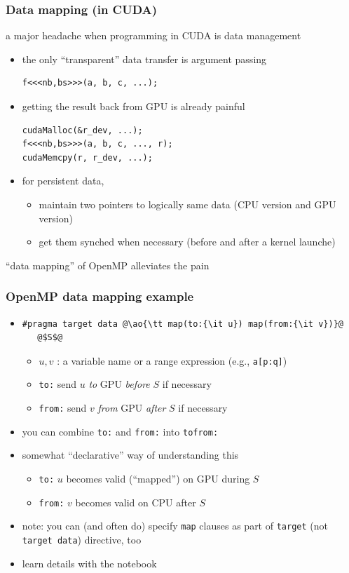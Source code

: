 \documentclass[12pt,dvipdfmx]{beamer}
\newcommand{\ao}[1]{{\color{blue}#1}}
\begin{document}
\begin{frame}[fragile]
  \frametitle{Data mapping (in CUDA)}
  a major headache when programming in CUDA is data management
  
  \begin{itemize}
  \item the only ``transparent'' data transfer is argument passing
\begin{lstlisting}
f<<<nb,bs>>>(a, b, c, ...);
\end{lstlisting}
  \item getting the result back from GPU is already painful
\begin{lstlisting}
cudaMalloc(&r_dev, ...);
f<<<nb,bs>>>(a, b, c, ..., r);
cudaMemcpy(r, r_dev, ...);
\end{lstlisting}
\item for persistent data,
  \begin{itemize}
  \item maintain two pointers to logically same data (CPU version and GPU version)
  \item get them synched when necessary (before and after a kernel launche)
  \end{itemize}
\end{itemize}

``data mapping'' of OpenMP alleviates the pain
\end{frame}

\begin{frame}[fragile]
  \frametitle{OpenMP data mapping example}
  \begin{itemize}
  \item 
\begin{lstlisting}
#pragma target data @\ao{\tt map(to:{\it u}) map(from:{\it v})}@
   @$S$@
\end{lstlisting}
\begin{itemize}
\item $u, v$ : a variable name or a range expression (e.g., {\tt a[p:q]})
\item \ao{\tt to:} send $u$ {\it to} GPU {\it before} $S$ if necessary
\item \ao{\tt from:} send $v$ {\it from} GPU {\it after} $S$ if necessary
\end{itemize}
\item you can combine \ao{\tt to:} and \ao{\tt from:} into \ao{\tt tofrom:}
\item somewhat ``declarative'' way of understanding this
  \begin{itemize}
  \item \ao{\tt to:} $u$ becomes valid (``mapped'') on GPU during $S$
  \item \ao{\tt from:} $v$ becomes valid on CPU after $S$
  \end{itemize}
\item note: you can (and often do) specify {\tt map} clauses as part of
  {\tt target} (not {\tt target data}) directive, too
\item learn details with the notebook
\end{itemize}
\end{frame}
\end{document}
